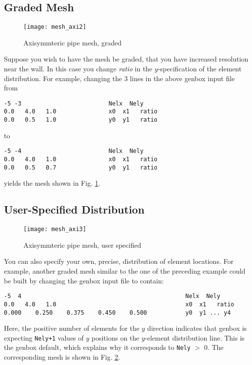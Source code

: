 \subsection{Graded Mesh}
\begin{figure}
\centering
\texttt{[image: mesh\_axi2]}
\caption{Axisymmteric pipe mesh, graded}
\label{fig:mesh_axi2}
\end{figure}

Suppose you wish to have the mesh be graded,
that you have increased resolution near the wall.
In this case you change {\em ratio} in the \(y\)-specification
of the element distribution.  For example, changing the 3 lines
in the above genbox input file from

\begin{verbatim}
-5 -3                         Nelx  Nely
0.0   4.0   1.0               x0  x1   ratio
0.0   0.5   1.0               y0  y1   ratio
\end{verbatim}

\noindent
to

\begin{verbatim}
-5 -4                         Nelx  Nely
0.0   4.0   1.0               x0  x1   ratio
0.0   0.5   0.7               y0  y1   ratio
\end{verbatim}

\noindent
yields the mesh shown in Fig. \ref{fig:mesh_axi2}.


\subsection{User-Specified Distribution}
\begin{figure}
\centering
\texttt{[image: mesh\_axi3]}
\caption{Axisymmteric pipe mesh, user specified}
\label{fig:mesh_axi3}
\end{figure}

You can also specify your own, precise, distribution of element
locations.   For example, another graded mesh similar to the
one of the preceding example could be built by changing the
genbox input file to contain:


\begin{verbatim}
-5  4                                               Nelx  Nely
0.0   4.0   1.0                                     x0  x1   ratio
0.000    0.250    0.375    0.450    0.500           y0  y1 ... y4
\end{verbatim}

\noindent
Here, the positive number of elements for the \(y\) direction indicates
that genbox is expecting {\tt Nely+1} values of \(y\) positions on the
\(y\)-element distribution line.   This is the genbox default, which
explains why it corresponds to {\tt Nely} \(>\) 0.  The corresponding mesh
is shown in Fig. \ref{fig:mesh_axi3}.


